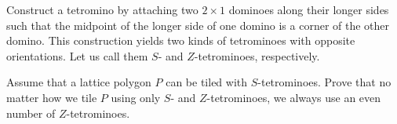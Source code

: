 Construct a tetromino by attaching two 
$2 \times 1$
 dominoes along their longer sides such that the midpoint of the longer side of one domino is a corner of the other domino. This construction yields two kinds of tetrominoes with opposite orientations. Let us call them 
$S$- and 
$Z$-tetrominoes, respectively.


Assume that a lattice polygon 
$P$
 can be tiled with 
$S$-tetrominoes. Prove that no matter how we tile 
$P$
 using only 
$S$- and 
$Z$-tetrominoes, we always use an even number of 
$Z$-tetrominoes.


